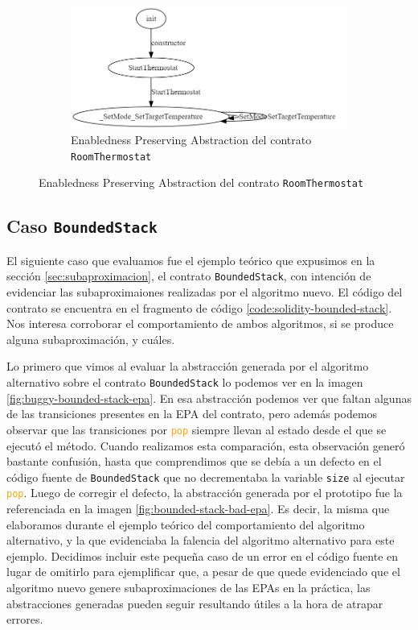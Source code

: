 \begin{figure}
    \centering
    \begin{subfigure}{0.75\textwidth}
        \includegraphics[width=\textwidth]{figs/room-thermostate-epa.png}
        \caption{Enabledness Preserving Abstraction del contrato \texttt{RoomThermostat} }
        \label{fig:room-thermostat-epa}
    \end{subfigure}
\end{figure}

\subsection{Caso \texttt{BoundedStack}}
El siguiente caso que evaluamos fue el ejemplo teórico que expusimos en la sección \ref{sec:subaproximacion}, el contrato \texttt{BoundedStack}, con intención de evidenciar las subaproximaiones realizadas por el algoritmo nuevo.
El código del contrato se encuentra en el fragmento de código \ref{code:solidity-bounded-stack}.
Nos interesa corroborar el comportamiento de ambos algoritmos, si se produce alguna subaproximación, y cuáles.

Lo primero que vimos al evaluar la abstracción generada por el algoritmo alternativo sobre el contrato \texttt{BoundedStack} lo podemos ver en la imagen \ref{fig:buggy-bounded-stack-epa}.
En esa abstracción  podemos ver que faltan algunas de las transiciones presentes en la EPA del contrato, pero además podemos observar que las transiciones por \textcolor{orange}{\texttt{pop}} siempre llevan al estado desde el que se ejecutó el método.
Cuando realizamos esta comparación, esta observación generó bastante confusión, hasta que comprendimos que se debía a un defecto en el código fuente de \texttt{BoundedStack} que no decrementaba la variable \texttt{size} al ejecutar \textcolor{orange}{\texttt{pop}}.
Luego de corregir el defecto, la abstracción generada por el prototipo fue la referenciada en la imagen \ref{fig:bounded-stack-bad-epa}.
Es decir, la misma que elaboramos durante el ejemplo teórico del comportamiento del algoritmo alternativo, y la que evidenciaba la falencia del algoritmo alternativo para este ejemplo.
Decidimos incluir este pequeña caso de un error en el código fuente en lugar de omitirlo para ejemplificar que, a pesar de que quede evidenciado que el algoritmo nuevo genere subaproximaciones de las EPAs en la práctica, las abstracciones generadas pueden seguir resultando útiles a la hora de atrapar errores.

